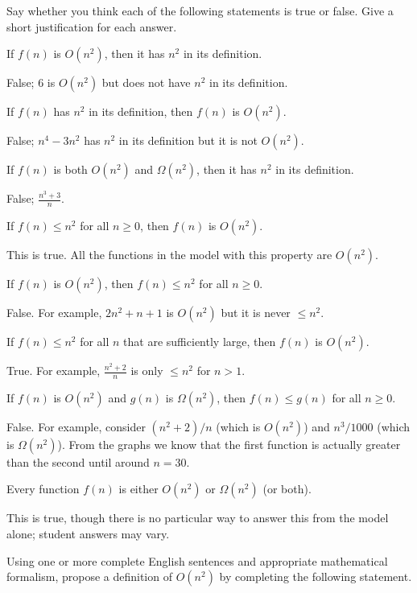 \documentclass{tufte-handout}
\begin{document}
\noindent Say whether you think each of the following statements is
true or false.  Give a short justification for each answer.

\begin{questions}
\item If $f(n)$ is $O(n^2)$, then it has $n^2$ in its definition.
  \begin{answer} False; \eg $6$ is $O(n^2)$ but does not have $n^2$
    in its definition.\end{answer}
\item If $f(n)$ has $n^2$ in its definition, then $f(n)$ is $O(n^2)$.
  \begin{answer} False; \eg $n^4 - 3n^2$ has $n^2$ in its definition
    but it is not $O(n^2)$.\end{answer}
\item If $f(n)$ is both $O(n^2)$ and $\Omega(n^2)$, then it has $n^2$
  in its definition.
  \begin{answer} False; \eg $\frac{n^3 + 3}{n}$. \end{answer}
\item If $f(n) \leq n^2$ for all $n \geq 0$, then $f(n)$ is $O(n^2)$.
  \begin{answer} This is true. All the functions in the model with
    this property are $O(n^2)$. \end{answer}
\item If $f(n)$ is $O(n^2)$, then $f(n) \leq n^2$ for all $n \geq 0$.
  \begin{answer}
    False.  For example, $2n^2 + n + 1$ is $O(n^2)$ but it is never
    $\leq n^2$.
  \end{answer}
\item If $f(n) \leq n^2$ for all $n$ that are sufficiently large, then
  $f(n)$ is $O(n^2)$.
  \begin{answer}
    True.  For example, $\frac{n^2 + 2}{n}$ is only $\leq n^2$ for $n
    > 1$.
  \end{answer}
\item If $f(n)$ is $O(n^2)$ and $g(n)$ is $\Omega(n^2)$, then $f(n)
  \leq g(n)$ for all $n \geq 0$.
  \begin{answer}
    False.  For example, consider $(n^2 + 2)/n$ (which is $O(n^2)$)
    and $n^3/1000$ (which is $\Omega(n^2)$).  From the graphs we know
    that the first function is actually greater than the second until
    around $n = 30$.
  \end{answer}
\item Every function $f(n)$ is either $O(n^2)$ or $\Omega(n^2)$ (or
  both).
  \begin{answer}
    This is true, though there is no particular way to answer this
    from the model alone; student answers may vary.
  \end{answer}
\item Using one or more complete English sentences and appropriate
  mathematical formalism, propose a definition of $O(n^2)$ by
  completing the following statement.


\end{questions}
\end{document}
